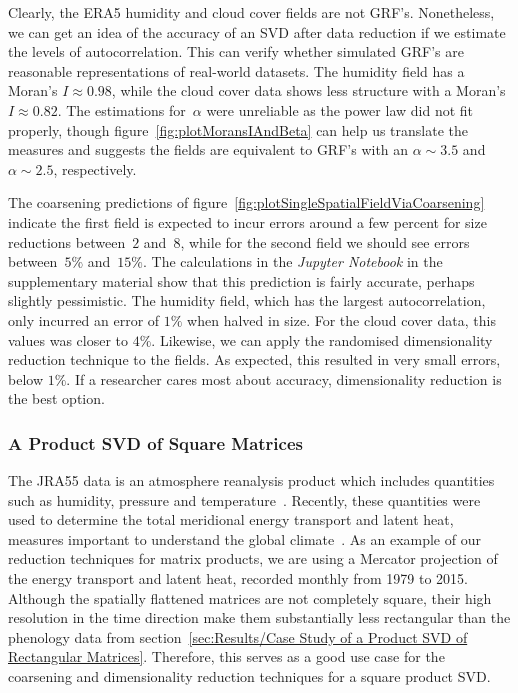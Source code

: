 \documentclass[ijgi,article,submit,moreauthors,pdftex,10pt,a4paper]{Definitions/mdpi}
\begin{document}
Clearly, the ERA5 humidity and cloud cover fields are not GRF's. Nonetheless, we can get an idea of the accuracy of an SVD after data reduction if we estimate the levels of autocorrelation. This can verify whether simulated GRF's are reasonable representations of real-world datasets. The humidity field has a Moran's $I \approx 0.98$, while the cloud cover data shows less structure with a Moran's $I \approx 0.82$. The estimations for~$\alpha$ were unreliable as the power law did not fit properly, though figure~\ref{fig:plotMoransIAndBeta} can help us translate the measures and suggests the fields are equivalent to GRF's with an $\alpha \sim 3.5$ and $\alpha \sim 2.5$, respectively.

The coarsening predictions of figure~\ref{fig:plotSingleSpatialFieldViaCoarsening} indicate the first field is expected to incur errors around a few percent for size reductions between~$2$ and~$8$, while for the second field we should see errors between~$5\%$ and~$15\%$. The calculations in the \textit{Jupyter Notebook} in the supplementary material show that this prediction is fairly accurate, perhaps slightly pessimistic. The humidity field, which has the largest autocorrelation, only incurred an error of $1\%$ when halved in size. For the cloud cover data, this values was closer to $4\%$. Likewise, we can apply the randomised dimensionality reduction technique to the fields. As expected, this resulted in very small errors, below $1\%$. If a researcher cares most about accuracy, dimensionality reduction is the best option.
\subsubsection{A Product SVD of Square Matrices}
\label{sec:Results/Case Study of a Product SVD of Square Matrices}

The JRA55 data is an atmosphere reanalysis product which includes quantities such as humidity, pressure and temperature~\cite{Kobayashi2015}. Recently, these quantities were used to determine the total meridional energy transport and latent heat, measures important to understand the global climate~\cite{Liu2018}. As an example of our reduction techniques for matrix products, we are using a Mercator projection of the energy transport and latent heat, recorded monthly from 1979 to 2015. Although the spatially flattened matrices are not completely square, their high resolution in the time direction make them substantially less rectangular than the phenology data from section~\ref{sec:Results/Case Study of a Product SVD of Rectangular Matrices}. Therefore, this serves as a good use case for the coarsening and dimensionality reduction techniques for a square product SVD.
\end{document}
